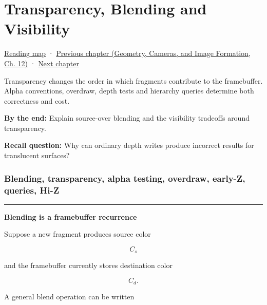 \chapter{Transparency, Blending and Visibility}\label{03-visual-computing-i-ch014-transparency-blending-and-visibility}\hypertarget{03-visual-computing-i-ch014}{}\label{stagechapter:03-visual-computing-i-ch014}

\hypertarget{03-visual-computing-i-ch014-transparency-blending-and-visibility}{}

\hyperref[volume-reading-map]{Reading map} · \href{../03-Geometry-Cameras-and-Image-Formation/main.pdf\#nameddest=03-visual-computing-i-ch013-from-view-space-to-clip-space}{Previous chapter (Geometry, Cameras, and Image Formation, Ch. 12)} · \hyperref[03-visual-computing-i-ch015-rasterization-foundations-and-renderer-evidence]{Next chapter}

Transparency changes the order in which fragments contribute to the framebuffer. Alpha conventions, overdraw, depth tests and hierarchy queries determine both correctness and cost.

\textbf{By the end:} Explain source-over blending and the visibility tradeoffs around transparency.

\textbf{Recall question:} Why can ordinary depth writes produce incorrect results for translucent surfaces?

\subsection{Blending, transparency, alpha testing, overdraw, early-Z, queries, Hi-Z}\label{03-visual-computing-i-ch014-blending-transparency-alpha-testing-overdraw-early-z-queries-hi-z}

\hypertarget{03-visual-computing-i-ch014-blending-transparency-alpha-testing-overdraw-early-z-queries-hi-z}{}

\begin{center}\rule{0.5\linewidth}{0.5pt}\end{center}

\textbf{Blending is a framebuffer recurrence}

Suppose a new fragment produces source color

\[
C_s
\]

and the framebuffer currently stores destination color

\[
C_d.
\]

A general blend operation can be written

